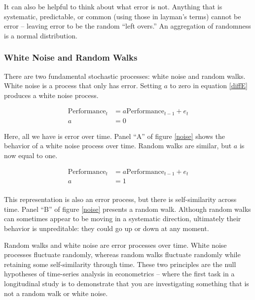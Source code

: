 \documentclass[english,,man]{apa6}
\theoremstyle{definition}
\theoremstyle{definition}
\theoremstyle{definition}
\theoremstyle{remark}
\begin{document}
It can also be helpful to think about what error is not. Anything that
is systematic, predictable, or common (using those in layman's terms)
cannot be error -- leaving error to be the random \enquote{left overs.}
An aggregation of randomness is a normal distribution.

\hypertarget{white-noise-and-random-walks}{%
\subsubsection{White Noise and Random
Walks}\label{white-noise-and-random-walks}}

There are two fundamental stochastic processes: white noise and random
walks. White noise is a process that only has error. Setting \(a\) to
zero in equation \ref{diffE} produces a white noise process.

\begin{equation}
\begin{split}
\label{whitenoise}
\textrm{Performance}_{t} &= a \textrm{Performance}_{t-1} + e_{t} \\
a &= 0
\end{split}
\end{equation}

\noindent Here, all we have is error over time. Panel \enquote{A} of
figure \ref{noise} shows the behavior of a white noise process over
time. Random walks are similar, but \(a\) is now equal to one.

\begin{equation}
\begin{split}
\label{rw}
\textrm{Performance}_{t} &= a \textrm{Performance}_{t-1} + e_{t} \\ 
a &= 1 \\ 
\end{split}
\end{equation}

\noindent This representation is also an error process, but there is
self-similarity across time. Panel \enquote{B} of figure \ref{noise}
presents a random walk. Although random walks can sometimes appear to be
moving in a systematic direction, ultimately their behavior is
unpreditable: they could go up or down at any moment.

Random walks and white noise are error processes over time. White noise
processes fluctuate randomly, whereas random walks fluctuate randomly
while retaining some self-similarity through time. These two principles
are the null hypotheses of time-series analysis in econometrics -- where
the first task in a longitudinal study is to demonstrate that you are
investigating something that is not a random walk or white noise.
\end{document}
